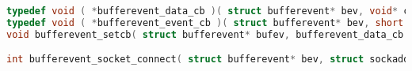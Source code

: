 \documentclass[legalpaper,10pt]{article}
\begin{document}
\begin{lstlisting}[language=C]
typedef void ( *bufferevent_data_cb )( struct bufferevent* bev, void* ctx );
typedef void ( *bufferevent_event_cb )( struct bufferevent* bev, short events, void* ctx );
void bufferevent_setcb( struct bufferevent* bufev, bufferevent_data_cb readcb, bufferevent_data_cb writecb, bufferevent_event_cb eventcb, void* cbarg );

int bufferevent_socket_connect( struct bufferevent* bev, struct sockaddr* address, int addrlen );

\end{lstlisting}
\end{document}

